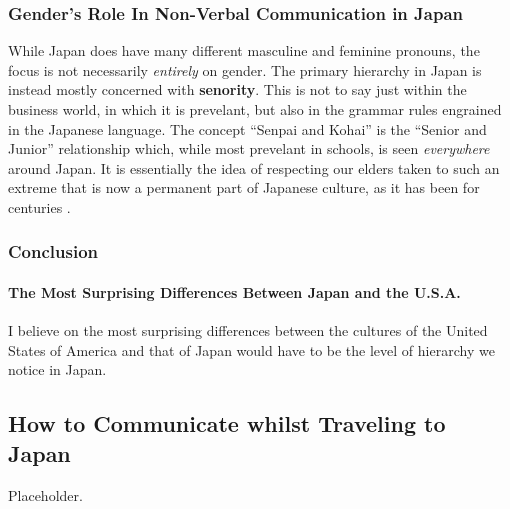 \documentclass[stu,12pt]{apa7}
\begin{document}
      \subsubsection{Gender's Role In Non-Verbal Communication in Japan}
        While Japan does have many different masculine and feminine pronouns,
          the focus is not necessarily \emph{entirely} on gender. The primary
          hierarchy in Japan is instead mostly concerned with \textbf{senority}.
          This is not to say just within the business world, in which it is
          prevelant, but also in the grammar rules engrained in the Japanese
          language. The concept ``Senpai and Kohai'' is the
          ``Senior and Junior'' relationship which, while most prevelant in
          schools, is seen \textit{everywhere} around Japan. It is essentially
          the idea of respecting our elders taken to such an extreme that is
          now a permanent part of Japanese culture, as it has been for centuries
          \parencite[pp. 253]{potts_japanese_nodate}.
      \subsubsection{Conclusion}
        \paragraph{The Most Surprising Differences Between Japan and the U.S.A.}
          I believe on the most surprising differences between the cultures of
            the United States of America and that of Japan would have to be
            the level of hierarchy we notice in Japan.

    \subsection{How to Communicate whilst Traveling to Japan}
      Placeholder.





  \newpage
  \nocite{*}
  \printbibliography[%
    title={Additional References},%
    heading={bibintoc},%
    category={consulted}%
  ]
\end{document}
